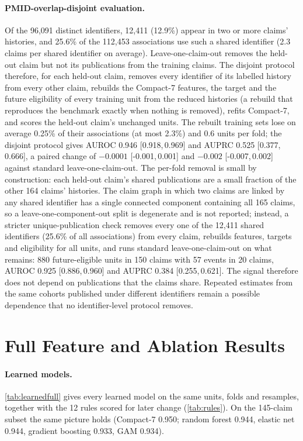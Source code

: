 \documentclass[11pt]{article}
\newcommand{\compact}{Compact-7\xspace}
\newcommand{\ci}[2]{[#1,\,#2]}
\begin{document}
\paragraph{PMID-overlap-disjoint evaluation.} Of the 96{,}091 distinct identifiers, 12{,}411
(12.9\%) appear in two or more claims' histories, and 25.6\% of the 112{,}453 associations use such
a shared identifier (2.3 claims per shared identifier on average). Leave-one-claim-out removes the
held-out claim but not its publications from the training claims. The disjoint protocol therefore,
for each held-out claim, removes every identifier of its labelled history from every other claim,
rebuilds the \compact features, the target and the future eligibility of every training unit
from the reduced histories (a rebuild that reproduces the benchmark exactly when nothing is
removed), refits \compact, and scores the held-out claim's unchanged units. The rebuilt training sets lose on average 0.25\% of their associations (at most 2.3\%) and 0.6
units per fold; the disjoint protocol gives AUROC 0.946 \ci{0.918}{0.969} and AUPRC 0.525
\ci{0.377}{0.666}, a paired change of $-0.0001$ \ci{-0.001}{0.001} and $-0.002$ \ci{-0.007}{0.002}
against standard leave-one-claim-out. The per-fold removal is small by construction: each held-out
claim's shared publications are a small fraction of the other 164 claims' histories. The claim
graph in which two claims are linked by any shared identifier has a single connected component
containing all 165 claims, so a leave-one-component-out split is degenerate and is not reported;
instead, a stricter unique-publication check removes every one of the 12{,}411 shared identifiers
(25.6\% of all associations) from every claim, rebuilds features, targets and eligibility for all
units, and runs standard leave-one-claim-out on what remains: 880 future-eligible units in 150 claims
with 57 events in 20 claims, AUROC 0.925 \ci{0.886}{0.960} and AUPRC 0.384 \ci{0.255}{0.621}. The
signal therefore does not depend on publications that the claims share. Repeated estimates from the same cohorts published under different identifiers
remain a possible dependence that no identifier-level protocol removes.

\section{Full Feature and Ablation Results}
\label{app:ablation}
\paragraph{Learned models.} \cref{tab:learnedfull} gives every learned model on the same
units, folds and resamples, together with the 12 rules scored for later change
(\cref{tab:rules}). On the 145-claim subset the same picture holds (\compact 0.950;
random forest 0.944, elastic net 0.944, gradient boosting 0.933, GAM 0.934).
\label{app:learned}
\end{document}
